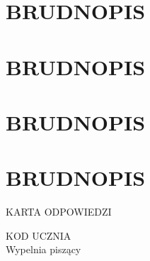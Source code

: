 \documentclass[10pt]{article}
\begin{document}
\section*{BRUDNOPIS}
\section*{BRUDNOPIS}
\section*{BRUDNOPIS}
\section*{BRUDNOPIS}
KARTA ODPOWIEDZI

KOD UCZNIA \(\qquad\)\\
Wypelnia piszący
\end{document}
